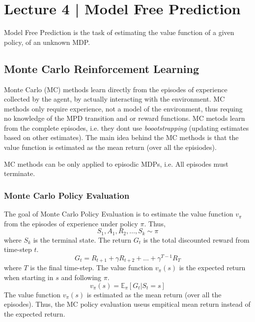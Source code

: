\section{Lecture 4 | Model Free Prediction}
Model Free Prediction is the task of estimating the value function of a given policy, 
of an unknown MDP. 

\subsection{Monte Carlo Reinforcement Learning}
Monte Carlo (MC) methods learn directly from the episodes of experience collected by
the agent, by actually interacting with the environment. MC methods only require
experience, not a model of the environment, thus requing no knowledge of the MPD transition 
and or reward functions. MC metods learn from the complete episodes,
i.e. they dont use \emph{boootstrapping} (updating estimates based 
on other estimates). The main idea behind the MC methods is that the value
function is estimated as the mean return (over all the episiodes).

\begin{note}
    MC methods can be only applied to episodic MDPs, i.e. 
    All episodes must terminate.
\end{note}

\subsubsection*{Monte Carlo Policy Evaluation}
The goal of Monte Carlo Policy Evaluation is to estimate the value function
\(v_{\pi}\) from the episodes of experience under policy \(\pi\).
Thus,
\[
    S_1, A_1, R_2, \dots, S_k  \sim \pi
\]
where \(S_k\) is the terminal state. The return \(G_t\) is the total discounted
reward from time-step \(t\).
\[
    G_t = R_{t+1} + \gamma R_{t+2} + \dots + \gamma^{T-1}R_T
\]
where \(T\) is the final time-step. The value function \(v_{\pi}(s)\) is the
expected return when starting in \(s\) and following \(\pi\).
\[
    v_{\pi}(s) = \mathbb{E}_{\pi}[G_t | S_t = s]
\]
The value function \(v_{\pi}(s)\) is estimated as the mean return (over all the
episodes). Thus, the MC policy evaluation useus empitical mean return instead of the
expected return.

